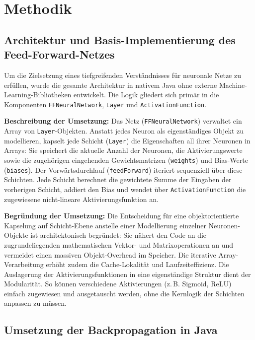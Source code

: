 \section{Methodik}
\label{sec:Methodik}

\subsection{Architektur und Basis-Implementierung des Feed-Forward-Netzes}
\label{sec:ffn-implementierung}

Um die Zielsetzung eines tiefgreifenden Verständnisses für neuronale Netze zu erfüllen, wurde die gesamte Architektur in nativem Java ohne externe Machine-Learning-Bibliotheken entwickelt. Die Logik gliedert sich primär in die Komponenten \texttt{FFNeuralNetwork}, \texttt{Layer} und \texttt{ActivationFunction}.

\textbf{Beschreibung der Umsetzung:}
Das Netz (\texttt{FFNeuralNetwork}) verwaltet ein Array von \texttt{Layer}-Objekten. Anstatt jedes Neuron als eigenständiges Objekt zu modellieren, kapselt jede Schicht (\texttt{Layer}) die Eigenschaften all ihrer Neuronen in Arrays: Sie speichert die aktuelle Anzahl der Neuronen, die Aktivierungswerte sowie die zugehörigen eingehenden Gewichtsmatrizen (\texttt{weights}) und Bias-Werte (\texttt{biases}). Der Vorwärtsdurchlauf (\texttt{feedForward}) iteriert sequenziell über diese Schichten. Jede Schicht berechnet die gewichtete Summe der Eingaben der vorherigen Schicht, addiert den Bias und wendet über \texttt{ActivationFunction} die zugewiesene nicht-lineare Aktivierungsfunktion an.

\textbf{Begründung der Umsetzung:}
Die Entscheidung für eine objektorientierte Kapselung auf Schicht-Ebene anstelle einer Modellierung einzelner Neuronen-Objekte ist architektonisch begründet: Sie nähert den Code an die zugrundeliegenden mathematischen Vektor- und Matrixoperationen an und vermeidet einen massiven Objekt-Overhead im Speicher. Die iterative Array-Verarbeitung erhöht zudem die Cache-Lokalität und Laufzeiteffizienz. Die Auslagerung der Aktivierungsfunktionen in eine eigenständige Struktur dient der Modularität. So können verschiedene Aktivierungen (z.\,B. Sigmoid, ReLU) einfach zugewiesen und ausgetauscht werden, ohne die Kernlogik der Schichten anpassen zu müssen.

\subsection{Umsetzung der Backpropagation in Java}
\label{sec:backpropagation-implementierung}

